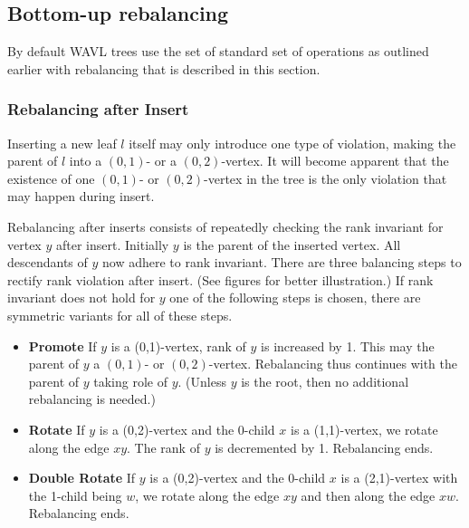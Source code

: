 \subsection{Bottom-up rebalancing}

By default WAVL trees use the set of standard set of operations as outlined earlier with rebalancing that is described in this section.


\subsubsection*{Rebalancing after Insert}

Inserting a new leaf $l$ itself may only introduce one type of violation, making the parent of $l$ into a $(0,1)$- or a $(0,2)$-vertex. It will become apparent that the existence of one $(0,1)$- or $(0,2)$-vertex in the tree is the only violation that may happen during insert. 

Rebalancing after inserts consists of repeatedly checking the rank invariant for vertex $y$ after insert. Initially $y$ is the parent of the inserted vertex. All descendants of $y$ now adhere to rank invariant. There are three balancing steps to rectify rank violation after insert. (See figures for better illustration.) If rank invariant does not hold for $y$ one of the following steps is chosen, there are symmetric variants for all of these steps. 

\begin{itemize}
	\item \textbf{Promote} If $y$ is a (0,1)-vertex, rank of $y$ is increased by 1. This may the parent of $y$ a $(0,1)$- or $(0,2)$-vertex. Rebalancing thus continues with the parent of $y$ taking role of $y$. (Unless $y$ is the root, then no additional rebalancing is needed.)
	\item \textbf{Rotate} If $y$ is a (0,2)-vertex and the 0-child $x$ is a (1,1)-vertex, we rotate along the edge $xy$. The rank of $y$ is decremented by 1. Rebalancing ends.
	\item \textbf{Double Rotate} If $y$ is a (0,2)-vertex and the 0-child $x$ is a (2,1)-vertex with the 1-child being $w$, we rotate along the edge $xy$ and then along the edge $xw$. Rebalancing ends.
\end{itemize}

